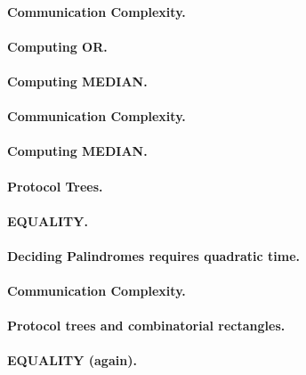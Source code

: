 \documentclass[11pt,a4paper]{article}
\theoremstyle{definition}
\begin{document}
\paragraph{Communication Complexity.}

\paragraph{Computing OR.}

\paragraph{Computing MEDIAN.}

\paragraph{Communication Complexity.}

\paragraph{Computing MEDIAN.}

\paragraph{Protocol Trees.}

\paragraph{EQUALITY.}

\paragraph{Deciding Palindromes requires quadratic time.}

\paragraph{Communication Complexity.}

\paragraph{Protocol trees and combinatorial rectangles.}

\paragraph{EQUALITY (again).}
\end{document}
